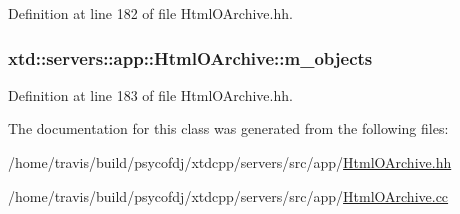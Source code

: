 Definition at line 182 of file Html\-O\-Archive.\-hh.

\hypertarget{classxtd_1_1servers_1_1app_1_1HtmlOArchive_a69e333ff9b2b0743e14976cfa4afd6d2}{
\subsubsection[{m\-\_\-objects}]{ xtd\-::servers\-::app\-::\-Html\-O\-Archive\-::m\-\_\-objects}}\label{classxtd_1_1servers_1_1app_1_1HtmlOArchive_a69e333ff9b2b0743e14976cfa4afd6d2}


Definition at line 183 of file Html\-O\-Archive.\-hh.



The documentation for this class was generated from the following files\-:\begin{DoxyCompactItemize}
\item 
/home/travis/build/psycofdj/xtdcpp/servers/src/app/\hyperlink{HtmlOArchive_8hh}{Html\-O\-Archive.\-hh}\item 
/home/travis/build/psycofdj/xtdcpp/servers/src/app/\hyperlink{HtmlOArchive_8cc}{Html\-O\-Archive.\-cc}\end{DoxyCompactItemize}
